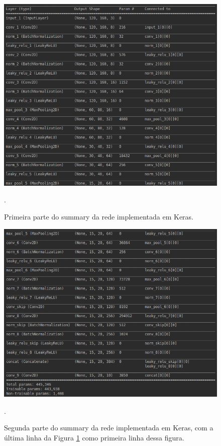 \documentclass[conference]{IEEEtran}
\begin{document}
\begin{figure}[htbp]
\centering
\centerline{\includegraphics[scale=0.35]{imagens/tabela1.png}}
\caption{Primeira parte do summary da rede implementada em Keras.}.
\label{tabela1}
\end{figure}

\begin{figure}[htbp]
\centering
\centerline{\includegraphics[scale=0.35]{imagens/tabela2.png}}
\caption{Segunda parte do summary da rede implementada em Keras, com a última linha da Figura \ref{tabela1} como primeira linha dessa figura.}.
\label{tabela2}
\end{figure} 
\end{document}
